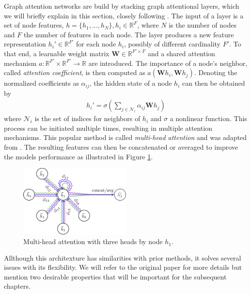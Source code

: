 \label{chapter:GAT Architecture}

Graph attention networks are build by stacking graph attentional layers, which we will briefly explain in this section, closely following \cite{velickovic2018graph}. The input of a layer is a set of node features, $h = \{h_1,...,h_N\}, h_i \in \mathbb{R}^F$, where $N$ is the number of nodes and $F$ the number of features in each node. The layer produces a new feature representation $h_i' \in \mathbb{R}^{F'}$ for each node $h_i$, possibly of different cardinality $F'$. To that end, a learnable weight matrix $\mathbf{W} \in \mathbb{R}^{F' \times F}$ and a shared attention mechanism $a: \mathbb{R}^{F'} \times \mathbb{R}^{F'} \rightarrow \mathbb{R}$ are introduced. The importance of a node's neighbor, called \textit{attention coefficient}, is then computed as $a(\mathbf{W}h_i, \mathbf{W}h_j)$. Denoting the normalized coefficients as $\alpha_{ij}$, the hidden state of a node $h_i$ can then be obtained by
\begin{align*}
    h_i' = \sigma(\sum_{j \in \mathcal{N}_i} \alpha_{ij}\mathbf{W}h_j)
\end{align*}
where $\mathcal{N}_i$ is the set of indices for neighbors of $h_i$ and $\sigma$ a nonlinear function. This process can be initiated multiple times, resulting in multiple attention mechanisms. This popular method is called \textit{multi-head attention} and was adapted from \cite{vaswani2017attention}. The resulting features can then be concatenated or averaged to improve the models performance  as illustrated in Figure \ref{fig:multi-head}.

\begin{figure}[h]
    \centering
    \includegraphics[width=0.5\textwidth]{img/multi_head.png}
    \caption{Multi-head attention with three heads by node $h_1$. \cite{velickovic2018graph}}
    \label{fig:multi-head}
\end{figure}
Allthough this architexture has similarities with prior methods, it solves several issues with its flexibility. We will refer to the original paper for more details but mention two desirable properties that will be important for the subsequent chapters. 

